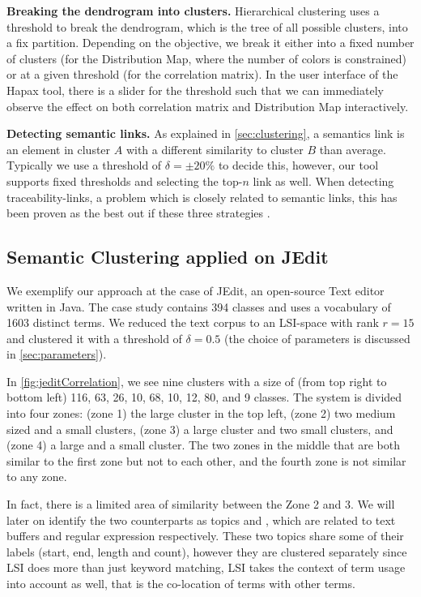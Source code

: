 \documentclass[10pt]{book}
\begin{document}
  \textbf{Breaking the dendrogram into clusters.} Hierarchical clustering uses a threshold to break the dendrogram, which is the tree of all possible clusters, into a fix partition. Depending on the objective, we break it either into a fixed number of clusters (\eg for the Distribution Map, where the number of colors is constrained) or at a given threshold (\eg for the correlation matrix). In the user interface of the Hapax tool, there is a slider for the threshold such that we can immediately observe the effect on both correlation matrix and Distribution Map interactively.

  \textbf{Detecting semantic links.} As explained in \autoref{sec:clustering}, a semantics link is an element in cluster $A$ with a different similarity to cluster $B$ than average. Typically we use a threshold of $\delta = \pm20\%$ to decide this, however, our tool supports fixed thresholds and selecting the top-$n$ link as well. When detecting traceability-links, a problem which is closely related to semantic links, this has been proven as the best out if these three strategies \cite{Luci04a}.

\subsection{Semantic Clustering applied on JEdit}

We exemplify our approach at the case of JEdit, an open-source Text editor written in Java. The case study contains 394 classes and uses a vocabulary of 1603 distinct terms. We reduced the text corpus to an LSI-space with rank $r = 15$ and clustered it with a threshold of $\delta = 0.5$ (the choice of parameters is discussed in \autoref{sec:parameters}).

In \autoref{fig:jeditCorrelation}, we see nine clusters with a size of (from top right to bottom left) 116, 63, 26, 10, 68, 10, 12, 80, and 9 classes. The system is divided into four zones: (zone 1) the large cluster in the top left, (zone 2) two medium sized and a small clusters, (zone 3) a large cluster and two small clusters, and (zone 4) a large and a small cluster. The two zones in the middle that are both similar to the first zone but not to each other, and the fourth zone is not similar to any zone.

In fact, there is a limited area of similarity between the Zone 2 and 3. We will later on identify the two counterparts as topics \pink and \cyan, which are related to text buffers and regular expression respectively. These two topics share some of their labels (\ie start, end, length and count), however they are clustered separately since LSI does more than just keyword matching, LSI takes the context of term usage into account as well, that is the co-location of terms with other terms.
\end{document}
